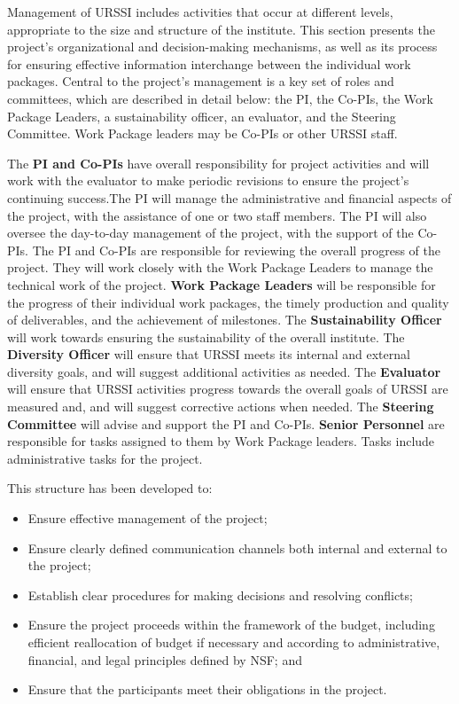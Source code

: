 \documentclass[
]{book}
\providecommand{\tightlist}{%
  \setlength{\itemsep}{0pt}\setlength{\parskip}{0pt}}
\begin{document}
Management of URSSI includes activities that occur at different levels, appropriate to the size and
structure of the institute. This section presents the project's organizational and decision-making
mechanisms, as well as its process for ensuring effective information interchange between the
individual work packages. Central to the project's management is a key set of roles and committees,
which are described in detail below: the PI, the Co-PIs, the Work Package Leaders, a sustainability
officer, an evaluator, and the Steering Committee. Work Package leaders may be Co-PIs or other URSSI staff.

The \textbf{PI and Co-PIs} have overall responsibility for project activities and will work with the
evaluator to make periodic revisions to ensure the project's continuing success.The PI will manage
the administrative and financial aspects of the project, with the assistance of one or two staff
members. The PI will also oversee the day-to-day management of the project, with the support of the
Co-PIs. The PI and Co-PIs are responsible for reviewing the overall progress of the project. They will
work closely with the Work Package Leaders to manage the technical work of the project.
\textbf{Work Package Leaders} will be responsible for the progress of their individual work packages, the
timely production and quality of deliverables, and the achievement of milestones.
The \textbf{Sustainability Officer} will work towards ensuring the sustainability of the overall institute.
The \textbf{Diversity Officer} will ensure that URSSI meets its internal and external diversity goals, and will
suggest additional activities as needed.
The \textbf{Evaluator} will ensure that URSSI activities progress towards the overall goals of URSSI are measured and,
and will suggest corrective actions when needed.
The \textbf{Steering Committee} will advise and support the PI and Co-PIs. \textbf{Senior Personnel} are
responsible for tasks assigned to them by Work Package leaders. Tasks include administrative tasks for the project.

This structure has been developed to:

\begin{itemize}
\tightlist
\item
  Ensure effective management of the project;
\item
  Ensure clearly defined communication channels both internal and external to the project;
\item
  Establish clear procedures for making decisions and resolving conflicts;
\item
  Ensure the project proceeds within the framework of the budget, including efficient reallocation of budget if necessary and according to administrative, financial, and legal principles defined by NSF; and
\item
  Ensure that the participants meet their obligations in the project.
\end{itemize}
\end{document}
